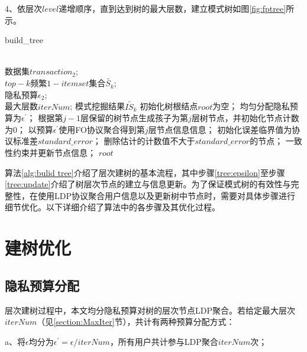 \documentclass[UTF8]{ctexart}
\begin{document}
4、依层次$level$递增顺序，直到达到树的最大层数，建立模式树如图\ref{fig:fptree}所示。

\begin{algorithm}[ht]
\caption{build\_tree}
\label{alg:bulid tree}
\begin{algorithmic}[1]
\REQUIRE ~~\\
数据集$transaction_2$;\\
$top-k$频繁$1-itemset$集合$\tilde{S_k}$;\\
隐私预算$\epsilon_2$;\\
最大层数$iterNum$;
\ENSURE 模式挖掘结果$\tilde{IS_k}$
\STATE 初始化树根结点$root$为空；
    \STATE 均匀分配隐私预算为$\epsilon^{\prime}$；
    \label{tree:epsilon}
    \STATE 根据第$j-1$层保留的树节点生成孩子为第$j$层树节点，并初始化节点计数为0；
    \label{tree:child node}
    \STATE 以预算$\epsilon^{\prime}$使用FO协议聚合得到第$j$层节点信息信息；
    \label{tree:FO}
    \STATE 初始化误差临界值为协议标准差$standard\_error$；
    \label{tree:error bound}
    \STATE 删除估计的计数值不大于$standard\_error$的节点；
    \label{tree:filter}
    \STATE 一致性约束并更新节点信息；
    \label{tree:consistency and update}
\ENDFOR
\RETURN $root$
\end{algorithmic}
\end{algorithm}


算法\ref{alg:bulid tree}介绍了层次建树的基本流程，其中步骤\ref{tree:epsilon}至步骤\ref{tree:update}介绍了树层次节点的建立与信息更新。为了保证模式树的有效性与完整性，在使用LDP协议聚合用户信息以及更新树中节点时，需要对具体步骤进行细节优化。以下详细介绍了算法中的各步骤及其优化过程。

\section{建树优化}

\subsection{隐私预算分配}\label{section:Allocate privacy budget}
层次建树过程中，本文均分隐私预算对树的层次节点LDP聚合。若给定最大层次$iterNum$（见\ref{section:MaxIter}节），共计有两种预算分配方式：

a、将$\epsilon$均分为$\epsilon^{\prime} = \epsilon / iterNum$，所有用户共计参与LDP聚合$iterNum$次；
\end{document}
